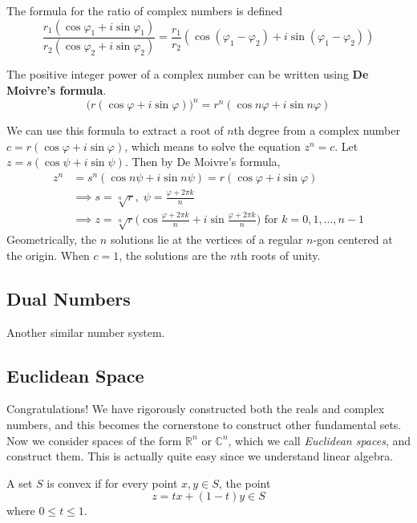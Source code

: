   \begin{corollary}
    The formula for the ratio of complex numbers is defined
    \begin{equation}
      \frac{r_1 (\cos{\varphi_1} + i \sin{\varphi_1})}{r_2 (\cos{\varphi_2} + i \sin{\varphi_2})} = \frac{r_1}{r_2} (\cos{(\varphi_1 - \varphi_2)} + i \sin{(\varphi_1 - \varphi_2)})
    \end{equation}
  \end{corollary}

  \begin{corollary}
    The positive integer power of a complex number can be written using \textbf{De Moivre's formula}. 
    \begin{equation}
      \big(r(\cos{\varphi} + i \sin{\varphi})\big)^n = r^n (\cos{n \varphi} + i \sin{n \varphi})
    \end{equation}
  \end{corollary}

  We can use this formula to extract a root of $n$th degree from a complex number $c = r(\cos{\varphi} + i \sin{\varphi})$, which means to solve the equation $z^n = c$. Let $z = s (\cos{\psi} + i \sin{\psi})$. Then by De Moivre's formula, 
  \begin{align*}
    z^n & = s^n (\cos{n \psi} + i \sin{n \psi}) = r(\cos{\varphi} + i \sin{\varphi}) \\
    & \implies s = \sqrt[n]{r}, \; \psi = \frac{\varphi + 2\pi k}{n} \\
    & \implies z = \sqrt[n]{r} \bigg( \cos{\frac{\varphi + 2\pi k}{n}} + i \sin{\frac{\varphi + 2\pi k}{n}}\bigg) \text{ for } k = 0, 1, ..., n-1
  \end{align*}
  Geometrically, the $n$ solutions lie at the vertices of a regular $n$-gon centered at the origin. When $c = 1$, the solutions are the $n$th roots of unity.

\subsection{Dual Numbers}

  Another similar number system. 

\subsection{Euclidean Space} 

  Congratulations! We have rigorously constructed both the reals and complex numbers, and this becomes the cornerstone to construct other fundamental sets. Now we consider spaces of the form $\mathbb{R}^n$ or $\mathbb{C}^n$, which we call \textit{Euclidean spaces}, and construct them. This is actually quite easy since we understand linear algebra. 

  \begin{definition}
    A set $S$ is convex if for every point $x, y \in S$, the point 
    \begin{equation}
      z = t x + (1 - t) y \in S
    \end{equation}
    where $0 \leq t \leq 1$. 
  \end{definition}


